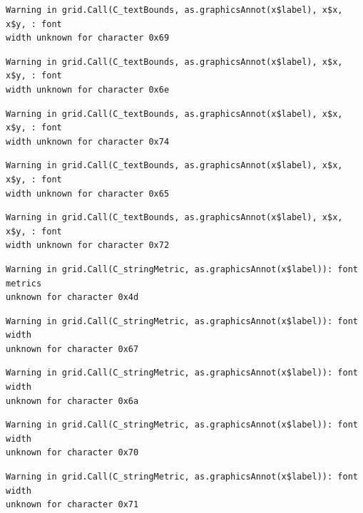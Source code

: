 \documentclass[
  letterpaper,
]{scrbook}
\begin{document}
\begin{verbatim}
Warning in grid.Call(C_textBounds, as.graphicsAnnot(x$label), x$x, x$y, : font
width unknown for character 0x69
\end{verbatim}

\begin{verbatim}
Warning in grid.Call(C_textBounds, as.graphicsAnnot(x$label), x$x, x$y, : font
width unknown for character 0x6e
\end{verbatim}

\begin{verbatim}
Warning in grid.Call(C_textBounds, as.graphicsAnnot(x$label), x$x, x$y, : font
width unknown for character 0x74
\end{verbatim}

\begin{verbatim}
Warning in grid.Call(C_textBounds, as.graphicsAnnot(x$label), x$x, x$y, : font
width unknown for character 0x65
\end{verbatim}

\begin{verbatim}
Warning in grid.Call(C_textBounds, as.graphicsAnnot(x$label), x$x, x$y, : font
width unknown for character 0x72
\end{verbatim}

\begin{verbatim}
Warning in grid.Call(C_stringMetric, as.graphicsAnnot(x$label)): font metrics
unknown for character 0x4d
\end{verbatim}

\begin{verbatim}
Warning in grid.Call(C_stringMetric, as.graphicsAnnot(x$label)): font width
unknown for character 0x67
\end{verbatim}

\begin{verbatim}
Warning in grid.Call(C_stringMetric, as.graphicsAnnot(x$label)): font width
unknown for character 0x6a
\end{verbatim}

\begin{verbatim}
Warning in grid.Call(C_stringMetric, as.graphicsAnnot(x$label)): font width
unknown for character 0x70
\end{verbatim}

\begin{verbatim}
Warning in grid.Call(C_stringMetric, as.graphicsAnnot(x$label)): font width
unknown for character 0x71
\end{verbatim}
\end{document}
